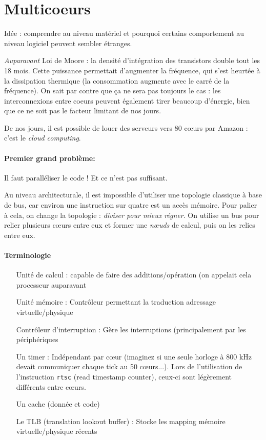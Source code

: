 \documentclass{article}
\begin{document}
\section{Multicoeurs}
Idée : comprendre au niveau matériel et pourquoi certains comportement au niveau logiciel peuvent sembler étranges.

\emph{Auparavant} Loi de Moore : la densité d'intégration des transistors double tout les 18 mois. Cette puissance permettait d'augmenter la fréquence, qui s'est heurtée à la dissipation thermique (la consommation augmente avec le carré de la fréquence). On sait par contre que ça ne sera pas toujours le cas : les interconnexions entre coeurs peuvent également tirer beaucoup d'énergie, bien que ce ne soit pas le facteur limitant de nos jours.

De nos jours, il est possible de louer des serveurs vers 80 cœurs par Amazon : c'est le \emph{cloud computing}.
\bigskip

\paragraph{Premier grand problème:}
Il faut paralléliser le code ! Et ce n'est pas suffisant.
\bigskip

Au niveau architecturale, il est impossible d'utiliser une topologie classique à base de bus, car environ une instruction sur quatre est un accès mémoire. Pour palier à cela, on change la topologie : \emph{diviser pour mieux régner}. On utilise un bus pour relier plusieurs cœurs entre eux et former une \emph{nœuds} de calcul, puis on les relies entre eux.
\bigskip

\paragraph{Terminologie}
\begin{itemize}
\item[Unité de calcul :] capable de faire des additions/opération (on appelait cela processeur auparavant
\item[Unité mémoire :] Contrôleur permettant la traduction adressage virtuelle/physique
\item[Contrôleur d'interruption :] Gère les interruptions (principalement par les périphériques
\item[Un timer :] Indépendant par cœur (imaginez si une seule horloge à 800 kHz devait communiquer chaque tick au 50 cœurs...). Lors de l'utilisation de l'instruction \texttt{rtsc} (read timestamp counter), ceux-ci sont légèrement différents entre cœurs.
\item[Un cache (donnée et code)]
\item[Le TLB (translation lookout buffer) :] Stocke les mapping mémoire virtuelle/physique récents
\end{itemize}
\end{document}
